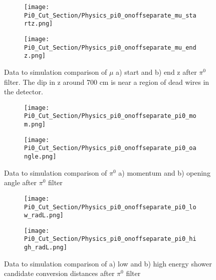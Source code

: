 \begin{figure}[H]
\centering
  \begin{subfigure}[t]{0.3\textwidth}
    \centering
\texttt{[image: Pi0\_Cut\_Section/Physics\_pi0\_onoffseparate\_mu\_startz.png]}
  \caption{ }
  \end{subfigure} 
  \hspace{30mm}
  \begin{subfigure}[t]{0.3\textwidth}
    \centering
\texttt{[image: Pi0\_Cut\_Section/Physics\_pi0\_onoffseparate\_mu\_endz.png]}
  \caption{ }
  \end{subfigure} 
\caption{ Data to simulation comparison of $\mu$ a) start and b) end z after $\pi^0$ filter.  The dip in z around 700 cm is near a region of dead wires in the detector. }
\label{fig:physics_pi0_mu_z}
\end{figure}

\begin{figure}[H]
\centering
  \begin{subfigure}[t]{0.3\textwidth}
    \centering
\texttt{[image: Pi0\_Cut\_Section/Physics\_pi0\_onoffseparate\_pi0\_mom.png]}
  \caption{ }
  \end{subfigure} 
  \hspace{30mm}
  \begin{subfigure}[t]{0.3\textwidth}
    \centering
\texttt{[image: Pi0\_Cut\_Section/Physics\_pi0\_onoffseparate\_pi0\_oangle.png]} 
  \caption{ }
  \end{subfigure} 
\label{fig:physics_pi0_pi0_oangle}
\caption{ Data to simulation comparison of $\pi^0$ a) momentum and b) opening angle after $\pi^0$ filter }
\end{figure}

\begin{figure}[H]
\centering
  \begin{subfigure}[t]{0.3\textwidth}
    \centering
\texttt{[image: Pi0\_Cut\_Section/Physics\_pi0\_onoffseparate\_pi0\_low\_radL.png]}
  \caption{ }
  \end{subfigure} 
  \hspace{30mm}
  \begin{subfigure}[t]{0.3\textwidth}
    \centering
\texttt{[image: Pi0\_Cut\_Section/Physics\_pi0\_onoffseparate\_pi0\_high\_radL.png]}
  \caption{ }
  \end{subfigure} 
\label{fig:physics_pi0_pi0_rl}
\caption{ Data to simulation comparison of a) low and b) high energy shower candidate conversion distances  after $\pi^0$ filter }
\end{figure}

